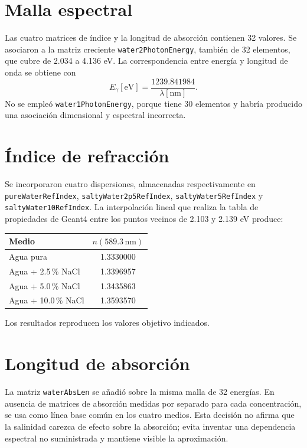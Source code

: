 \documentclass[11pt,a4paper]{article}
\newcommand{\codigo}[1]{\texttt{#1}}
\begin{document}
\section{Malla espectral}
Las cuatro matrices de índice y la longitud de absorción contienen 32 valores.
Se asociaron a la matriz creciente \codigo{water2PhotonEnergy}, también de 32
elementos, que cubre de 2.034 a 4.136 eV. La correspondencia entre energía y
longitud de onda se obtiene con
\begin{equation}
 E_\gamma[\mathrm{eV}]=\frac{1239.841984}{\lambda[\mathrm{nm}]}.
\end{equation}
No se empleó \codigo{water1PhotonEnergy}, porque tiene 30 elementos y habría
producido una asociación dimensional y espectral incorrecta.

\section{Índice de refracción}
Se incorporaron cuatro dispersiones, almacenadas respectivamente en
\codigo{pureWaterRefIndex}, \codigo{saltyWater2p5RefIndex},
\codigo{saltyWater5RefIndex} y
\codigo{saltyWater10RefIndex}.
La interpolación lineal que realiza la tabla de propiedades de Geant4 entre los
puntos vecinos de 2.103 y 2.139 eV produce:
\begin{center}
\begin{tabular}{lc}
\toprule
Medio & $n(589.3\,\mathrm{nm})$\\
\midrule
Agua pura & 1.3330000\\
Agua + 2.5\,\% NaCl & 1.3396957\\
Agua + 5.0\,\% NaCl & 1.3435863\\
Agua + 10.0\,\% NaCl & 1.3593570\\
\bottomrule
\end{tabular}
\end{center}
Los resultados reproducen los valores objetivo indicados.

\section{Longitud de absorción}
La matriz \codigo{waterAbsLen} se añadió sobre la misma malla de 32 energías.
En ausencia de matrices de absorción medidas por separado para cada
concentración, se usa como línea base común en los cuatro medios. Esta decisión
no afirma que la salinidad carezca de efecto sobre la absorción; evita inventar
una dependencia espectral no suministrada y mantiene visible la aproximación.
\end{document}
